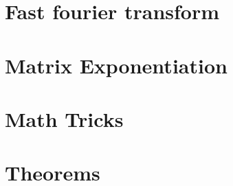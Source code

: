 \documentclass[twocolumn, landscape]{report}
\begin{document}
        \section{Fast fourier transform}
        
        \section{Matrix Exponentiation}
        
        \section{Math Tricks}
        
        \section{Theorems}
        
\end{document}
